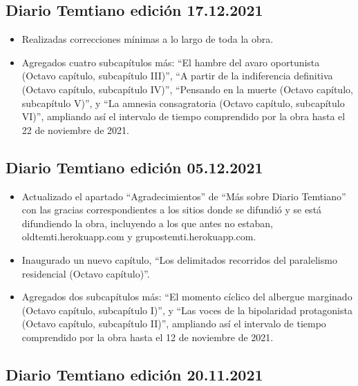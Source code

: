 \documentclass[
]{book}
\begin{document}
\hypertarget{diario-temtiano-ediciuxf3n-17.12.2021}{%
\subsection*{Diario Temtiano edición 17.12.2021}\label{diario-temtiano-ediciuxf3n-17.12.2021}}

\begin{itemize}
\item
  Realizadas correcciones mínimas a lo largo de toda la obra.
\item
  Agregados cuatro subcapítulos más: ``El hambre del avaro oportunista (Octavo capítulo, subcapítulo III)'', ``A partir de la indiferencia definitiva (Octavo capítulo, subcapítulo IV)'', ``Pensando en la muerte (Octavo capítulo, subcapítulo V)'', y ``La amnesia consagratoria (Octavo capítulo, subcapítulo VI)'', ampliando así el intervalo de tiempo comprendido por la obra hasta el 22 de noviembre de 2021.
\end{itemize}

\hypertarget{diario-temtiano-ediciuxf3n-05.12.2021}{%
\subsection*{Diario Temtiano edición 05.12.2021}\label{diario-temtiano-ediciuxf3n-05.12.2021}}

\begin{itemize}
\item
  Actualizado el apartado ``Agradecimientos'' de ``Más sobre Diario Temtiano'' con las gracias correspondientes a los sitios donde se difundió y se está difundiendo la obra, incluyendo a los que antes no estaban, oldtemti.herokuapp.com y grupostemti.herokuapp.com.
\item
  Inaugurado un nuevo capítulo, ``Los delimitados recorridos del paralelismo residencial (Octavo capítulo)''.
\item
  Agregados dos subcapítulos más: ``El momento cíclico del albergue marginado (Octavo capítulo, subcapítulo I)'', y ``Las voces de la bipolaridad protagonista (Octavo capítulo, subcapítulo II)'', ampliando así el intervalo de tiempo comprendido por la obra hasta el 12 de noviembre de 2021.
\end{itemize}

\hypertarget{diario-temtiano-ediciuxf3n-20.11.2021}{%
\subsection*{Diario Temtiano edición 20.11.2021}\label{diario-temtiano-ediciuxf3n-20.11.2021}}
\end{document}
